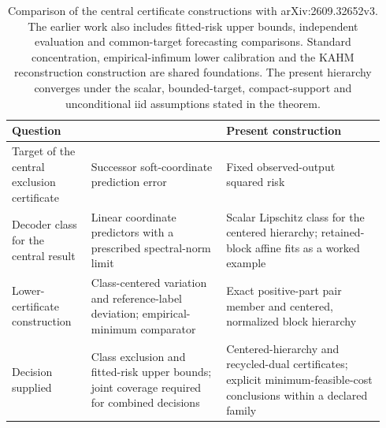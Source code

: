 \begin{table}[t]
\centering\small
\begin{tabular}{@{}p{0.20\linewidth}p{0.34\linewidth}p{0.40\linewidth}@{}}
\toprule
Question & \citet{kumar2026limits} & Present construction \\
\midrule
Target of the central exclusion certificate
& Successor soft-coordinate prediction error
& Fixed observed-output squared risk \\
Decoder class for the central result
& Linear coordinate predictors with a prescribed spectral-norm limit
& Scalar Lipschitz class for the centered hierarchy; retained-block affine fits as a worked example \\
Lower-certificate construction
& Class-centered variation and reference-label deviation; empirical-minimum comparator
& Exact positive-part pair member and centered, normalized block hierarchy \\
Decision supplied
& Class exclusion and fitted-risk upper bounds; joint coverage required for combined decisions
& Centered-hierarchy and recycled-dual certificates; explicit minimum-feasible-cost conclusions within a declared family \\
\bottomrule
\end{tabular}
\caption{Comparison of the central certificate constructions with
arXiv:2609.32652v3. The earlier work also includes fitted-risk upper
bounds, independent evaluation and common-target forecasting comparisons.
Standard concentration, empirical-infimum lower calibration and the KAHM
reconstruction construction are shared foundations. The present hierarchy
converges under the scalar, bounded-target, compact-support and unconditional
iid assumptions stated in the theorem.}
\label{tab:prior-comparison}
\end{table}

